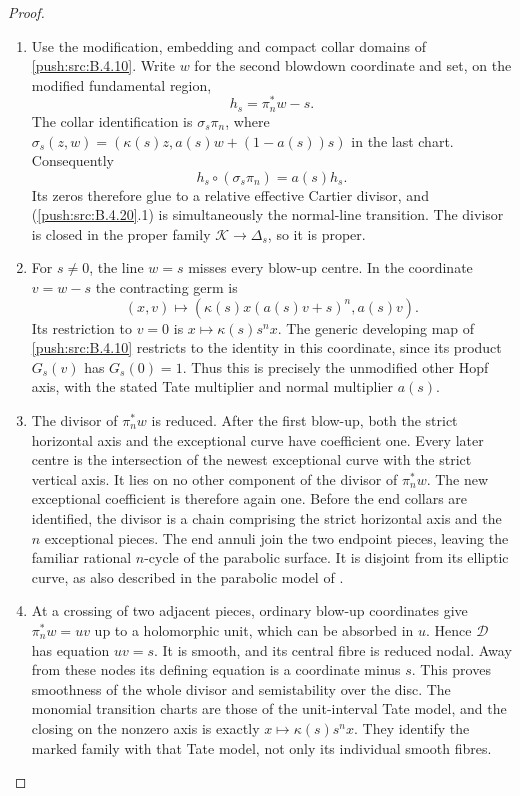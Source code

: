 \begin{proof}
\begin{enumerate}[label=\arabic*.,leftmargin=*]
\item Use the modification, embedding and compact collar
domains of \ref{push:src:B.4.10}. Write $w$ for the second blowdown
coordinate and set, on the modified fundamental region,
\[
 h_s=\pi_n^*w-s.
\]
The collar identification is $\sigma_s\pi_n$, where
$\sigma_s(z,w)=(\kappa(s)z,a(s)w+(1-a(s))s)$ in
the last chart. Consequently
\[
 h_s\circ(\sigma_s\pi_n)=a(s)h_s.
 \tag{B.4.20.1}
\]
Its zeros therefore glue to a relative effective
Cartier divisor, and (\ref{push:src:B.4.20}.1) is simultaneously the
normal-line transition. The divisor is closed in the
proper family $\mathcal K\to\Delta_s$, so it is proper.

\item For $s\ne0$, the line $w=s$ misses every blow-up centre.
In the coordinate $v=w-s$ the contracting germ is
\[
 (x,v)\longmapsto
       (\kappa(s)x(a(s)v+s)^n,a(s)v).
\]
Its restriction to $v=0$ is
$x\mapsto\kappa(s)s^n x$. The generic developing
map of \ref{push:src:B.4.10} restricts to the identity in this
coordinate, since its product $G_s(v)$ has
$G_s(0)=1$. Thus this is precisely the unmodified
other Hopf axis, with the stated Tate multiplier
and normal multiplier $a(s)$.

\item The divisor of $\pi_n^*w$ is reduced. After the first
blow-up, both the strict horizontal axis and the
exceptional curve have coefficient one. Every later
centre is the intersection of the newest exceptional
curve with the strict vertical axis. It lies on no
other component of the divisor of $\pi_n^*w$.
The new exceptional coefficient is therefore again
one. Before the end collars are identified, the
divisor is a chain comprising the strict horizontal
axis and the $n$ exceptional pieces. The end annuli
join the two endpoint pieces, leaving the familiar
rational $n$-cycle of the parabolic surface.
It is disjoint from its elliptic curve, as also
described in the parabolic model of
\cite[Example 9.10]{IstratiEtAl2022Root}.

\item At a crossing of two adjacent pieces, ordinary
blow-up coordinates give $\pi_n^*w=uv$ up to a
holomorphic unit, which can be absorbed in $u$.
Hence $\mathcal D$ has equation $uv=s$. It is
smooth, and its central fibre is reduced nodal.
Away from these nodes its defining equation is
a coordinate minus $s$. This proves smoothness
of the whole divisor and semistability over the disc.
The monomial transition charts are those of the
unit-interval Tate model, and the closing on the
nonzero axis is exactly $x\mapsto\kappa(s)s^n x$.
They identify the marked family with that Tate
model, not only its individual smooth fibres.


\end{enumerate}
\end{proof}
